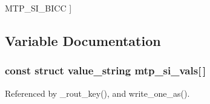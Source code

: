 \begin{Desc}
\begin{description}
{M\+T\+P\+\_\+\+S\+I\+\_\+\+B\+I\+CC\label{mtp_8h_abbcdf8dde4c7ba50da30b262a98594d2a22953c713354145b111b3b15359c55c4}
}]\item[{\em 
M\+T\+P\+\_\+\+S\+I\+\_\+\+G\+CP\label{mtp_8h_abbcdf8dde4c7ba50da30b262a98594d2a07b1d9bf91850c3da63581c4628a4ee5}
}]\end{description}
\end{Desc}


\subsection{Variable Documentation}
\subsubsection[{mtp\+\_\+si\+\_\+vals}]{\setlength{\rightskip}{0pt plus 5cm}const struct value\+\_\+string mtp\+\_\+si\+\_\+vals[$\,$]}\label{mtp_8h_a302af65ae379fd4c883fae04233ad551}


Referenced by \+\_\+rout\+\_\+key(), and write\+\_\+one\+\_\+as().

